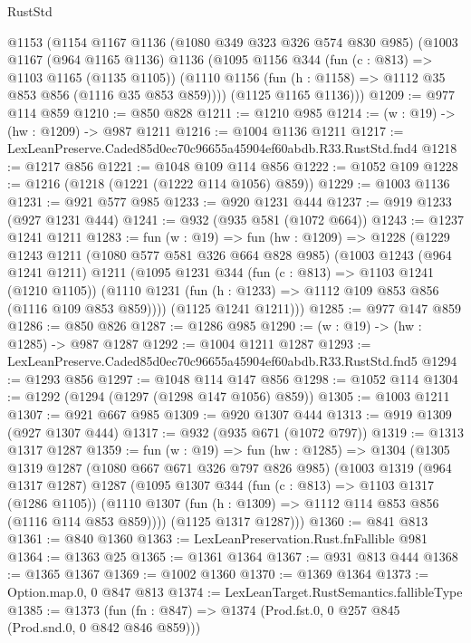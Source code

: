 \begin{lexlean}{RustStd}
\begin{coremodule}
  @1153
    (@1154
      @1167
      @1136
      (@1080 @349 @323 @326 @574 @830 @985)
      (@1003
        @1167
        (@964 @1165 @1136)
        @1136
        (@1095
          @1156
          @344
          (fun (c : @813) => @1103 @1165 (@1135 @1105))
          (@1110 @1156 (fun (h : @1158) => @1112 @35 @853 @856 (@1116 @35 @853 @859))))
        (@1125 @1165 @1136)))
@1209 := @977 @114 @859
@1210 := @850 @828
@1211 := @1210 @985
@1214 := (w : @19) -> (hw : @1209) -> @987 @1211
@1216 := @1004 @1136 @1211
@1217 := LexLeanPreserve.Caded85d0ec70c96655a45904ef60abdb.R33.RustStd.fnd4
@1218 := @1217 @856
@1221 := @1048 @109 @114 @856
@1222 := @1052 @109
@1228 := @1216 (@1218 (@1221 (@1222 @114 @1056) @859))
@1229 := @1003 @1136
@1231 := @921 @577 @985
@1233 := @920 @1231 @444
@1237 := @919 @1233 (@927 @1231 @444)
@1241 := @932 (@935 @581 (@1072 @664))
@1243 := @1237 @1241 @1211
@1283 := fun (w : @19) =>
  fun (hw : @1209) =>
  @1228
    (@1229
      @1243
      @1211
      (@1080 @577 @581 @326 @664 @828 @985)
      (@1003
        @1243
        (@964 @1241 @1211)
        @1211
        (@1095
          @1231
          @344
          (fun (c : @813) => @1103 @1241 (@1210 @1105))
          (@1110 @1231 (fun (h : @1233) => @1112 @109 @853 @856 (@1116 @109 @853 @859))))
        (@1125 @1241 @1211)))
@1285 := @977 @147 @859
@1286 := @850 @826
@1287 := @1286 @985
@1290 := (w : @19) -> (hw : @1285) -> @987 @1287
@1292 := @1004 @1211 @1287
@1293 := LexLeanPreserve.Caded85d0ec70c96655a45904ef60abdb.R33.RustStd.fnd5
@1294 := @1293 @856
@1297 := @1048 @114 @147 @856
@1298 := @1052 @114
@1304 := @1292 (@1294 (@1297 (@1298 @147 @1056) @859))
@1305 := @1003 @1211
@1307 := @921 @667 @985
@1309 := @920 @1307 @444
@1313 := @919 @1309 (@927 @1307 @444)
@1317 := @932 (@935 @671 (@1072 @797))
@1319 := @1313 @1317 @1287
@1359 := fun (w : @19) =>
  fun (hw : @1285) =>
  @1304
    (@1305
      @1319
      @1287
      (@1080 @667 @671 @326 @797 @826 @985)
      (@1003
        @1319
        (@964 @1317 @1287)
        @1287
        (@1095
          @1307
          @344
          (fun (c : @813) => @1103 @1317 (@1286 @1105))
          (@1110 @1307 (fun (h : @1309) => @1112 @114 @853 @856 (@1116 @114 @853 @859))))
        (@1125 @1317 @1287)))
@1360 := @841 @813
@1361 := @840 @1360
@1363 := LexLeanPreservation.Rust.fnFallible @981
@1364 := @1363 @25
@1365 := @1361 @1364
@1367 := @931 @813 @444
@1368 := @1365 @1367
@1369 := @1002 @1360
@1370 := @1369 @1364
@1373 := Option.map.{0, 0} @847 @813
@1374 := LexLeanTarget.RustSemantics.fallibleType
@1385 := @1373
    (fun (fn : @847) => @1374 (Prod.fst.{0, 0} @257 @845 (Prod.snd.{0, 0} @842 @846 @859)))

\end{coremodule}
\end{lexlean}

